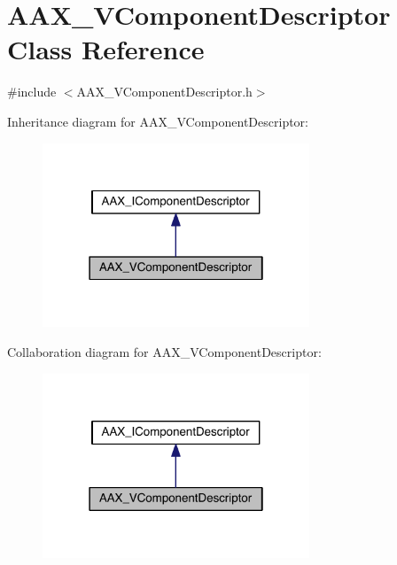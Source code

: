 \hypertarget{a00131}{}\section{A\+A\+X\+\_\+\+V\+Component\+Descriptor Class Reference}
\label{a00131}


{\ttfamily \#include $<$A\+A\+X\+\_\+\+V\+Component\+Descriptor.\+h$>$}



Inheritance diagram for A\+A\+X\+\_\+\+V\+Component\+Descriptor\+:
\nopagebreak
\begin{figure}[H]
\begin{center}
\leavevmode
\includegraphics[width=226pt]{a00689}
\end{center}
\end{figure}


Collaboration diagram for A\+A\+X\+\_\+\+V\+Component\+Descriptor\+:
\nopagebreak
\begin{figure}[H]
\begin{center}
\leavevmode
\includegraphics[width=226pt]{a00690}
\end{center}
\end{figure}


